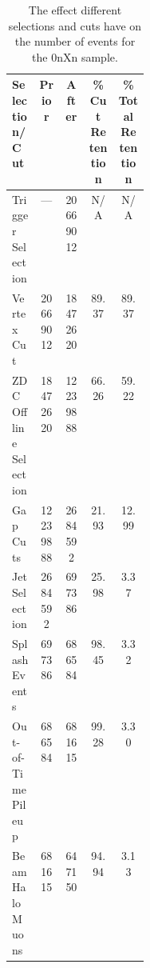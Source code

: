\begin{table}[]\label{tab:0nXn_events}
\centering
\begin{threeparttable}
\begin{tabular}{ p{0.2\linewidth} c c c c }
\toprule
\textbf{Selection/Cut} & \textbf{Prior} & \textbf{After} & \textbf{\% Cut Retention} & \textbf{\% Total Retention}\\
\toprule
Trigger Selection & --- & 20669012 & N/A & N/A\\
\hline
Vertex Cut & 20669012 & 18472620 & 89.37 & 89.37\\
\hline
ZDC Offline Selection & 18472620 & 12239888 & 66.26 & 59.22\\
\hline
Gap Cuts & 12239888 & 2684592 & 21.93 & 12.99\\
\hline
Jet Selection & 2684592 & 697386 & 25.98 & 3.37\\
\hline
Splash Events & 697386 & 686584 & 98.45 & 3.32\\
\hline
Out-of-Time Pileup & 686584 & 681615 & 99.28 & 3.30\\
\hline
Beam Halo Muons & 681615 & 647150 & 94.94 & 3.13\\
\bottomrule
\end{tabular}
\end{threeparttable}
\caption{The effect different selections and cuts have on the number of events for the 0nXn sample.}
\label{tab:0nXn_cutTable}
\end{table}